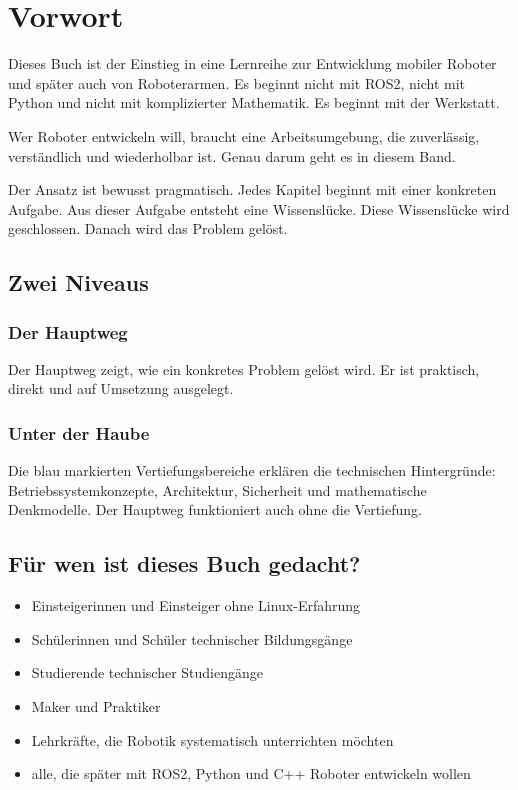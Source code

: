\documentclass[
  11pt,
  twoside,           %
  parskip=half,
  headings=normal,
  bibliography=totoc,
  listof=totoc
]{scrbook}
\begin{document}

\frontmatter


\chapter*{Vorwort}

Dieses Buch ist der Einstieg in eine Lernreihe zur Entwicklung
mobiler Roboter und später auch von Roboterarmen. Es beginnt
nicht mit ROS2, nicht mit Python und nicht mit komplizierter
Mathematik. Es beginnt mit der Werkstatt.

Wer Roboter entwickeln will, braucht eine Arbeitsumgebung,
die zuverlässig, verständlich und wiederholbar ist.
Genau darum geht es in diesem Band.

Der Ansatz ist bewusst pragmatisch. Jedes Kapitel beginnt
mit einer konkreten Aufgabe. Aus dieser Aufgabe entsteht
eine Wissenslücke. Diese Wissenslücke wird geschlossen.
Danach wird das Problem gelöst.

\section*{Zwei Niveaus}

\subsection*{Der Hauptweg}
Der Hauptweg zeigt, wie ein konkretes Problem gelöst wird.
Er ist praktisch, direkt und auf Umsetzung ausgelegt.

\subsection*{Unter der Haube}
Die blau markierten Vertiefungsbereiche erklären die
technischen Hintergründe: Betriebssystemkonzepte, Architektur,
Sicherheit und mathematische Denkmodelle.
Der Hauptweg funktioniert auch ohne die Vertiefung.

\section*{Für wen ist dieses Buch gedacht?}

\begin{itemize}
  \item Einsteigerinnen und Einsteiger ohne Linux-Erfahrung
  \item Schülerinnen und Schüler technischer Bildungsgänge
  \item Studierende technischer Studiengänge
  \item Maker und Praktiker
  \item Lehrkräfte, die Robotik systematisch unterrichten möchten
  \item alle, die später mit ROS2, Python und C++ Roboter entwickeln wollen
\end{itemize}
\end{document}
